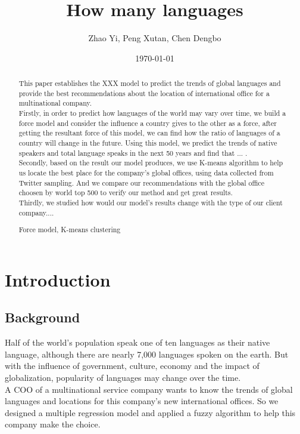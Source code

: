 \documentclass{mcmthesis}
\title {How many languages}
\author{Zhao Yi, Peng Xutan, Chen Dengbo}
\date{\today}
\begin{document}
\begin{abstract}

  \indent This paper establishes the XXX model to predict the trends of global languages and provide the best recommendations about the location of international office for a multinational company.\\
  \indent Firstly, in order to predict how languages of the world may vary over time, we build a force model and consider the influence a country gives to the other as a force, after getting the resultant force of this model, we can find how the ratio of languages of a country will change in the future. Using this model, we predict the trends of native speakers and total language speaks in the next 50 years and find that ... .\\
  \indent Secondly, based on the result our model produces, we use K-means algorithm to help us locate the best place for the company's global offices, using data collected from Twitter sampling. And we compare our recommendations with the global office choosen by world top 500 to verify our method and get great results.\\
  \indent Thirdly, we studied how would our model's results change with the type of our client company....
\begin{keywords}
  Force model, K-means clustering
\end{keywords}
\end{abstract}
\maketitle
\pagestyle{empty}
\newpage
\tableofcontents
\newpage
\pagestyle{fancy}
\setcounter{page}{1}
\section{Introduction}
\subsection{Background}
  \indent \indent Half of the world's population speak one of ten languages as their native language, although there are nearly 7,000 languages spoken on the earth. But with the influence of government, culture, economy and the impact of globalization, popularity of languages may change over the time. \\
  \indent A COO of a multinational service company wants to know the trends of global languages and locations for this company's new international offices. So we designed a multiple regression model and applied a fuzzy algorithm to help this company make the choice.
\end{document}
